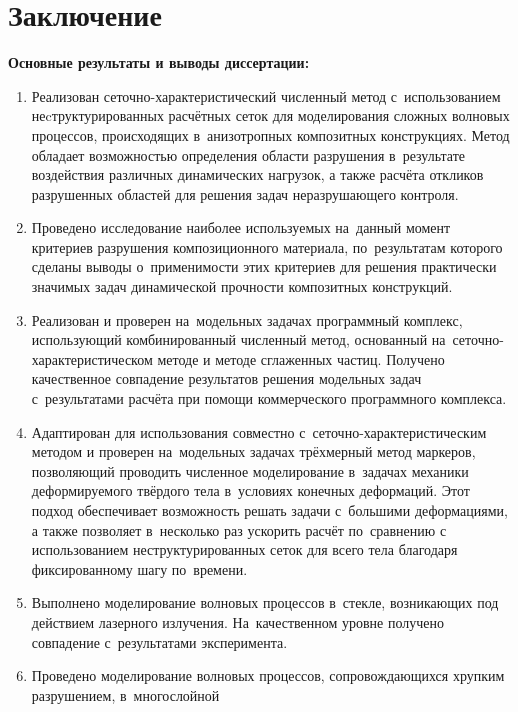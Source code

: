 \documentclass[thesis.tex]{subfiles}
\begin{document}
    \section*{Заключение}

    \textbf{Основные результаты и выводы диссертации:}

    \begin{enumerate}
        \item Реализован сеточно-характеристический численный метод с~использованием неcтруктурированных расчётных
              сеток для моделирования сложных волновых процессов, происходящих в~анизотропных композитных конструкциях.
              Метод обладает возможностью определения области разрушения в~результате воздействия различных динамических
              нагрузок, а также расчёта откликов разрушенных областей для решения задач неразрушающего контроля.
        \item Проведено исследование наиболее используемых на~данный момент критериев разрушения композиционного
              материала, по~результатам которого сделаны выводы о~применимости этих критериев для решения практически
              значимых задач динамической прочности композитных конструкций.
        \item Реализован и проверен на~модельных задачах программный комплекс, использующий комбинированный численный
              метод, основанный на~сеточно-характеристическом методе и методе сглаженных частиц. Получено качественное
              совпадение результатов решения модельных задач с~результатами расчёта при помощи коммерческого
              программного комплекса.
        \item Адаптирован для использования совместно с~сеточно-характеристи\-чес\-ким методом и проверен на~модельных
              задачах трёхмерный метод маркеров, позволяющий проводить численное моделирование в~задачах механики
              деформируемого твёрдого тела в~условиях конечных деформаций. Этот подход обеспечивает возможность решать
              задачи с~большими деформациями, а также позволяет в~несколько раз ускорить расчёт по~сравнению с
              использованием неструктурированных сеток для всего тела благодаря фиксированному шагу по~времени.
        \item Выполнено моделирование волновых процессов в~стекле, возникающих под действием лазерного излучения.
              На~качественном уровне получено совпадение с~результатами эксперимента.
        \item Проведено моделирование волновых процессов, сопровождающихся хрупким разрушением, в~многослойной

\end{enumerate}
\end{document}
